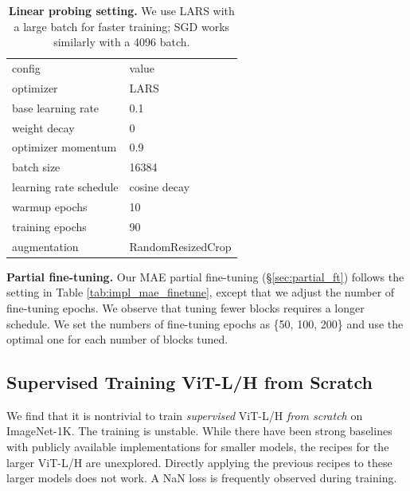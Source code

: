 \documentclass[10pt,twocolumn,letterpaper]{article}
\newcommand{\tablestyle}[2]{\setlength{\tabcolsep}{#1}\renewcommand{\arraystretch}{#2}\centering\footnotesize}
\renewcommand{\paragraph}[1]{\vspace{1.25mm}\noindent\textbf{#1}}
\begin{document}
\begin{table}[t]
\tablestyle{6pt}{1.02}
\scriptsize
\begin{tabular}{y{96}|y{68}}
config & value \\
\shline
optimizer & LARS \cite{You2017} \\
base learning rate & 0.1 \\
weight decay & 0 \\
optimizer momentum & 0.9 \\
batch size & 16384 \\
learning rate schedule & cosine decay \\
warmup epochs & 10 \\
training epochs & 90 \\
augmentation & RandomResizedCrop \\
\end{tabular}
\vspace{-.5em}
\caption{\textbf{Linear probing setting.} We use LARS with a large batch for faster training; SGD works similarly with a 4096 batch.
\label{tab:impl_mae_linear}}
\end{table}


\paragraph{Partial fine-tuning.} Our MAE partial fine-tuning (\S\ref{sec:partial_ft}) follows the setting in Table \ref{tab:impl_mae_finetune}, except that we adjust the number of fine-tuning epochs. We observe that tuning fewer blocks requires a longer schedule. We set the numbers of fine-tuning epochs as \{50, 100, 200\} and use the optimal one for each number of blocks tuned.

\subsection{Supervised Training ViT-L/H from Scratch}
\label{app:supervised_vit_large}

We find that it is nontrivial to train \textit{supervised} \mbox{ViT-L/H} \textit{from scratch} on ImageNet-1K. The training is unstable. While there have been strong baselines with publicly available implementations \cite{Touvron2021a} for smaller models, the recipes for the larger ViT-L/H are unexplored. Directly applying the previous recipes to these larger models does not work. A NaN loss is frequently observed during training.
\end{document}
